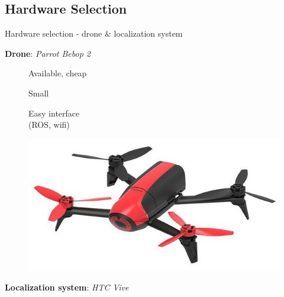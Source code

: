 \subsection{Hardware Selection}
\label{subsec:Hardw}

\begin{frame}{Hardware selection - drone \& localization system}

   \bit[label=\raisebox{0.25ex}{\tiny$\bullet$}]
        \item \textbf{Drone}: \textit{Parrot Bebop 2}
            
            \begin{figure}[H]
                \centering
                \begin{minipage}{.35\textwidth}
                    \bit[label=\raisebox{0.25ex}{\tiny$\bullet$}]
                        \item Available, cheap
                        \item Small
                        \item Easy interface\\ (ROS, wifi)
                    \eit
                \end{minipage} 
                \hspace{20mm}
                \begin{minipage}{0.30\textwidth}
                    \centering
                    \includegraphics[width=\textwidth]{Figures/bebop}
                    \label{fig:bebop}
                \end{minipage}
            \end{figure}
            
        \vspace{2mm}
 
        \item \textbf{Localization system}: \textit{HTC Vive}
            

\end{frame}
